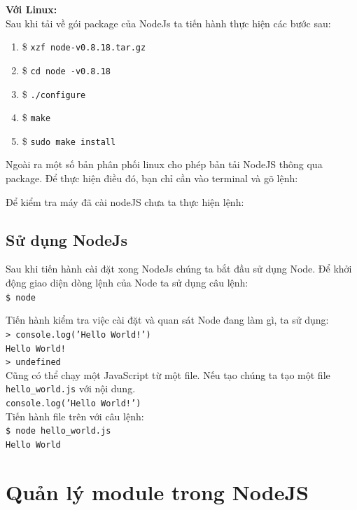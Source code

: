 	\textbf{Với Linux:}\\
		 Sau khi tải về gói package của NodeJs ta tiến hành thực hiện các bước sau:\\
			\begin{enumerate}
				\item \$ \texttt{xzf node-v0.8.18.tar.gz}
				\item \$ \texttt{cd node -v0.8.18}
				\item \$ \texttt{./configure}
				\item \$ \texttt{make}
				\item \$ \texttt{sudo make install}
			\end{enumerate}
		 Ngoài ra một số bản phân phối linux cho phép bản tải NodeJS thông qua package. Để thực hiện điều đó, bạn chỉ cần vào terminal và gõ lệnh:\\

	Để kiểm tra máy đã cài nodeJS chưa ta thực hiện lệnh:\\

	\subsection{Sử dụng NodeJs}
Sau khi tiến hành cài đặt xong NodeJs chúng ta bắt đầu sử dụng Node. Để khởi động giao diện dòng lệnh của Node ta sử dụng câu lệnh: \\
	\texttt{\$ node}

Tiến hành kiểm tra việc cài đặt và quan sát Node đang làm gì, ta sử dụng: \\
	\texttt{> console.log('Hello World!')}\\
	\texttt{Hello World!} \\
	\texttt{> undefined} \\

Cũng có thể chạy một JavaScript từ một file. Nếu tạo chúng ta tạo một file \texttt{hello\_world.js} với nội dung.\\
	\texttt{console.log('Hello World!')}\\

Tiến hành file trên với câu lệnh:\\
	\texttt{\$ node hello\_world.js} \\
	\texttt{Hello World}
\section{Quản lý module trong NodeJS}
